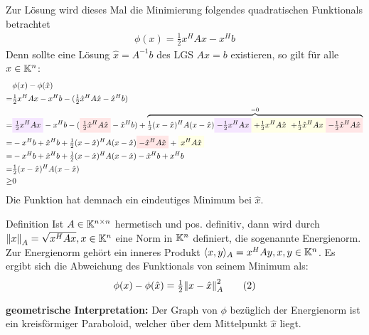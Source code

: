 Zur Lösung wird dieses Mal die Minimierung folgendes quadratischen Funktionals betrachtet
%
\begin{align*}
  \phi(x)
  = \tfrac{1}{2}x^H A x - x^H b
  \tag{1}\label{eq:CGVeq1}
\end{align*}
%
Denn sollte eine Lösung $\hat{x}=A^{-1}b$ des LGS $Ax=b$ existieren, so gilt für alle $x\in\mathbb K^{n}$:
%
\begin{align*}
  &\phi(x)-\phi(\hat{x}) \\
  =& \tfrac{1}{2}x^H A x - x^H b - (\tfrac{1}{2}\hat{x}^H A \hat{x} - \hat{x}^H b) \\
  =&  \highlight{mypurple}{\tfrac{1}{2}x^H A x} 
      - x^H b 
      - (\highlight{myred}{\tfrac{1}{2}\hat{x}^H A \hat{x}} 
      - \hat{x}^H b) 
      + \overbrace{
        \tfrac{1}{2}(x-\hat{x})^H A (x-\hat{x}) 
        \highlight{mypurple}{- \tfrac{1}{2} x^H A x}
        \highlight{myyellow}{+ \tfrac{1}{2}x^H A \hat{x}}
        \highlight{myyellow}{+ \tfrac{1}{2} \hat{x}^H A x}
        \highlight{myred}{- \tfrac{1}{2}\hat{x}^H A \hat{x}}
  }^{=0} \\
  =& -x^H b + \hat{x}^H b + \tfrac{1}{2}(x-\hat{x})^H A (x-\hat{x}) 
  \highlight{myred}{- \hat{x}^H A \hat{x}} + \highlight{myyellow}{x^H A \hat{x}} \\
  =& -x^H b + \hat{x}^H b + \tfrac{1}{2}(x-\hat{x})^H A (x-\hat{x})  - \hat{x}^H b + x^H b \\
  =& \tfrac{1}{2} (x-\hat{x})^H A(x-\hat{x}) \\
  \geq& 0
\end{align*}
%
Die Funktion hat demnach ein eindeutiges Minimum bei $\hat{x}$.

\begin{colbox}{Definition}
  Ist $A\in\mathbb K^{n\times n}$ hermetisch und pos. definitiv, dann wird durch $\vertn{2}{x}_A=\sqrt{x^HAx}, 
  x\in\K^{n}$ eine Norm in $\mathbb K^n$ definiert, die sogenannte Energienorm. 
  Zur Energienorm gehört ein inneres Produkt $\langle x,y\rangle_A=x^HAy, x,y\in\mathbb K^n$.
  Es ergibt sich die Abweichung des Funktionals von seinem Minimum als:
  \begin{align*}
    \phi(x)-\phi(\hat{x}) 
    = \tfrac{1}{2}\vertn{2}{x-\hat{x}}^2_A
    \tag{2}\label{eq:CGVeq2}
  \end{align*}
\end{colbox}

\textbf{geometrische Interpretation:} Der Graph von $\phi$ bezüglich der Energienorm ist ein kreisförmiger Paraboloid, 
welcher über dem Mittelpunkt $\hat{x}$ liegt. 

